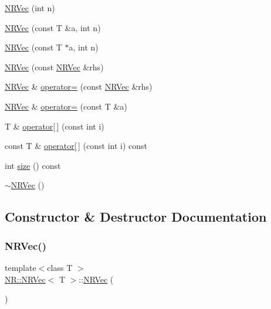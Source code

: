 \begin{DoxyCompactItemize}
\item 
\mbox{\hyperlink{classNR_1_1NRVec_a32e1c3a7b161ae48f90e95f44261c385}{N\+R\+Vec}} (int n)
\item 
\mbox{\hyperlink{classNR_1_1NRVec_a876abf88c99fa23c45098f2f48369ec9}{N\+R\+Vec}} (const T \&a, int n)
\item 
\mbox{\hyperlink{classNR_1_1NRVec_a20980fe6d9976332123225c883fbe67d}{N\+R\+Vec}} (const T $\ast$a, int n)
\item 
\mbox{\hyperlink{classNR_1_1NRVec_a89f4e31b7ca536611076d5ad70f84770}{N\+R\+Vec}} (const \mbox{\hyperlink{classNR_1_1NRVec}{N\+R\+Vec}} \&rhs)
\item 
\mbox{\hyperlink{classNR_1_1NRVec}{N\+R\+Vec}} \& \mbox{\hyperlink{classNR_1_1NRVec_a29999391ce59d89db129830e58ddf6ef}{operator=}} (const \mbox{\hyperlink{classNR_1_1NRVec}{N\+R\+Vec}} \&rhs)
\item 
\mbox{\hyperlink{classNR_1_1NRVec}{N\+R\+Vec}} \& \mbox{\hyperlink{classNR_1_1NRVec_af2d6c1894e28979a9c758a2f103832ee}{operator=}} (const T \&a)
\item 
T \& \mbox{\hyperlink{classNR_1_1NRVec_aa06286b2b6a9a51dd275d17c1b777bed}{operator\mbox{[}$\,$\mbox{]}}} (const int i)
\item 
const T \& \mbox{\hyperlink{classNR_1_1NRVec_a96caa29f8fb313218804268101c95e1a}{operator\mbox{[}$\,$\mbox{]}}} (const int i) const
\item 
int \mbox{\hyperlink{classNR_1_1NRVec_ab0dfb2d7ce74022fa0ce42138f4a224b}{size}} () const
\item 
\mbox{\hyperlink{classNR_1_1NRVec_a7161dfe4a95a73eca56d084c662f8eae}{$\sim$\+N\+R\+Vec}} ()
\end{DoxyCompactItemize}


\subsection{Constructor \& Destructor Documentation}
\mbox{\label{classNR_1_1NRVec_a3c549533b11738d9c1320abd0078f5aa}} 
\subsubsection{\texorpdfstring{NRVec()}{NRVec()}\hspace{0.1cm}{\footnotesize\ttfamily [1/10]}}
{\footnotesize\ttfamily template$<$class T $>$ \\
\mbox{\hyperlink{classNR_1_1NRVec}{N\+R\+::\+N\+R\+Vec}}$<$ T $>$\+::\mbox{\hyperlink{classNR_1_1NRVec}{N\+R\+Vec}} (\begin{DoxyParamCaption}{ }\end{DoxyParamCaption})}

